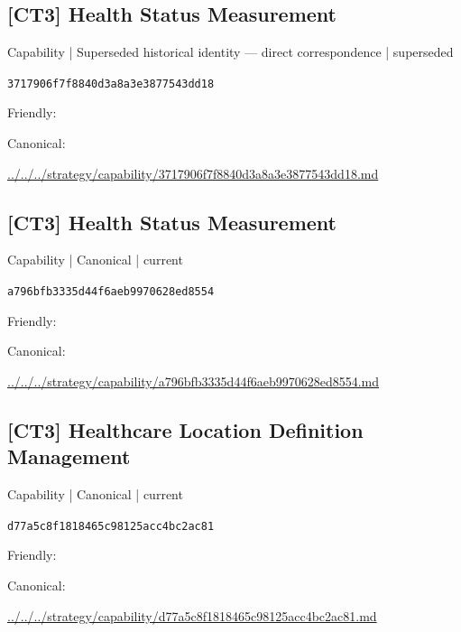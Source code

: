 \documentclass[10pt,a4paper]{article}
\begin{document}
\subsection*{[CT3] Health Status Measurement}
{\small Capability | Superseded historical identity — direct correspondence | superseded}\par
\texttt{3717906f7f8840d3a8a3e3877543dd18}\par
Friendly: \par
Canonical: \par
{\footnotesize\url{../../../strategy/capability/3717906f7f8840d3a8a3e3877543dd18.md}}\par
\subsection*{[CT3] Health Status Measurement}
{\small Capability | Canonical | current}\par
\texttt{a796bfb3335d44f6aeb9970628ed8554}\par
Friendly: \par
Canonical: \par
{\footnotesize\url{../../../strategy/capability/a796bfb3335d44f6aeb9970628ed8554.md}}\par
\subsection*{[CT3] Healthcare Location Definition Management}
{\small Capability | Canonical | current}\par
\texttt{d77a5c8f1818465c98125acc4bc2ac81}\par
Friendly: \par
Canonical: \par
{\footnotesize\url{../../../strategy/capability/d77a5c8f1818465c98125acc4bc2ac81.md}}\par
\end{document}
